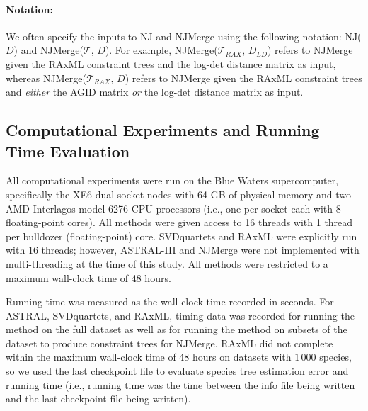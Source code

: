 \paragraph*{Notation:}
We often specify the inputs to NJ and NJMerge using the following notation: NJ($D$) and NJMerge($\mathcal{T}$, $D$). For example, NJMerge($\mathcal{T}_{RAX}$, $D_{LD}$) refers to NJMerge given the RAxML constraint trees and the log-det distance matrix as input, whereas NJMerge($\mathcal{T}_{RAX}$, $D$) refers to NJMerge given the RAxML constraint trees and {\em either} the AGID matrix {\em or} the log-det distance matrix as input.

\subsection{Computational Experiments and Running Time Evaluation}
\label{sec:njmerge-comp}
All computational experiments were run on the Blue Waters supercomputer, specifically the XE6 dual-socket nodes with 64 GB of physical memory and two AMD Interlagos model 6276 CPU processors (i.e., one per socket each with 8 floating-point cores).
All methods were given access to 16 threads with 1 thread per bulldozer (floating-point) core.
SVDquartets and RAxML were explicitly run with 16 threads; however, ASTRAL-III and NJMerge were not implemented with multi-threading at the time of this study.
All methods were restricted to a maximum wall-clock time of 48 hours.

Running time was measured as the wall-clock time recorded in seconds.
For ASTRAL, SVDquartets, and RAxML, timing data was recorded for running the method on the full dataset as well as for running the method on subsets of the dataset to produce constraint trees for NJMerge.
RAxML did not complete within the maximum wall-clock time of 48 hours on datasets with $1\,000$ species, so we used the last checkpoint file to evaluate species tree estimation error and running time (i.e., running time was the time between the info file being written and the last checkpoint file being written).

